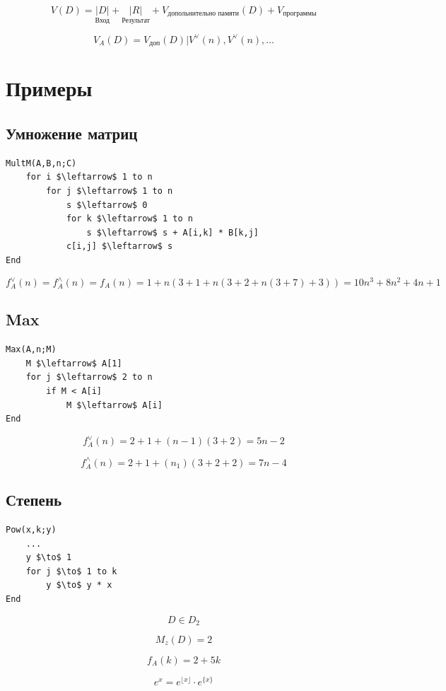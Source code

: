 \documentclass[a4paper, 14pt]{report}
\begin{document}
$$
V(D) = \underset{\text{Вход}}{|D|} + \underset{\text{Результат}}{|R|} + V_\text{допольнительно памяти}(D) + V_\text{программы}
$$

$$
V_A(D) = V_\text{доп}(D) | V^\vee(n), V^\vee(n), ...
$$

\chapter{Примеры}

\section{Умножение матриц}

\begin{lstlisting}
MultM(A,B,n;C)
    for i $\leftarrow$ 1 to n
        for j $\leftarrow$ 1 to n
            s $\leftarrow$ 0
            for k $\leftarrow$ 1 to n
                s $\leftarrow$ s + A[i,k] * B[k,j]
            c[i,j] $\leftarrow$ s
End
\end{lstlisting}

$$
f^\vee_A(n) = f^\wedge_A(n)=f_A(n) = 1 + n (3 + 1 + n (3 + 2 + n (3 + 7) + 3)) =
10 n^3 + 8n^2 + 4n + 1
$$

\section{Max}

\begin{lstlisting}
Max(A,n;M)
    M $\leftarrow$ A[1]
    for j $\leftarrow$ 2 to n
        if M < A[i]
            M $\leftarrow$ A[i]
End
\end{lstlisting}

$$
f^\vee_A(n) = 2 + 1 + (n-1) (3+2) = 5n - 2
$$

$$
f^\wedge_A(n) = 2 + 1 + (n_1) (3+2+2) = 7n - 4
$$

\section{Степень}

\begin{lstlisting}
Pow(x,k;y)
    ...
    y $\to$ 1
    for j $\to$ 1 to k
        y $\to$ y * x
End
\end{lstlisting}

$$
D \in D_2
$$

$$
M_z(D) = 2
$$

$$
f_A(k) = 2 + 5k
$$

$$
e^x=e^{\lfloor x \rfloor} \cdot e^{\{x\}}
$$
\end{document}
